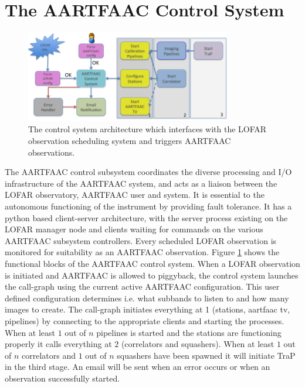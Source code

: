 \documentclass{ws-jai}
\begin{document}
\section {\label{sec:acontrol} The AARTFAAC Control System}
\begin{figure}[htbp]
\centering
\includegraphics[width=0.8\textwidth]{Figs/aartfaac_control_system/Slide1.png}
\caption{The  control  system  architecture  which  interfaces  with  the  LOFAR
  observation scheduling system and triggers AARTFAAC observations.}
\label{fig:afaac_ctrl_sys}
\end{figure}
The  AARTFAAC  control subsystem  coordinates  the  diverse processing  and  I/O
infrastructure of the  AARTFAAC system, and acts as a  liaison between the LOFAR
observatory,  AARTFAAC user  and  system.   It is  essential  to the  autonomous
functioning of  the instrument by  providing fault  tolerance.  It has  a python
based client-server architecture, with the  server process existing on the LOFAR
manager node and clients waiting for  commands on the various AARTFAAC subsystem
controllers. Every scheduled  LOFAR observation is monitored  for suitability as
an AARTFAAC  observation. Figure  \ref{fig:afaac_ctrl_sys} shows  the functional
blocks of  the AARTFAAC control system.   When a LOFAR observation  is initiated
and AARTFAAC is allowed to piggyback, the control system launches the call-graph
using   the  current   active   AARTFAAC  configuration.    This  user   defined
configuration determines i.e. what subbands to  listen to and how many images to
create.   The  call-graph initiates  everything  at  1 (stations,  aartfaac  tv,
pipelines)  by   connecting  to  the   appropriate  clients  and   starting  the
processes. When at  least $1$ out of  $n$ pipelines is started  and the stations
are  functioning   properly  it  calls   everything  at  $2$   (correlators  and
squashers).  When at  least  $1$ out  of  $n$  correlators and  $1$  out of  $n$
squashers have been spawned  it will initiate TraP in the  third stage. An email
will be sent when an error occurs or when an observation successfully started.\\
\end{document}
